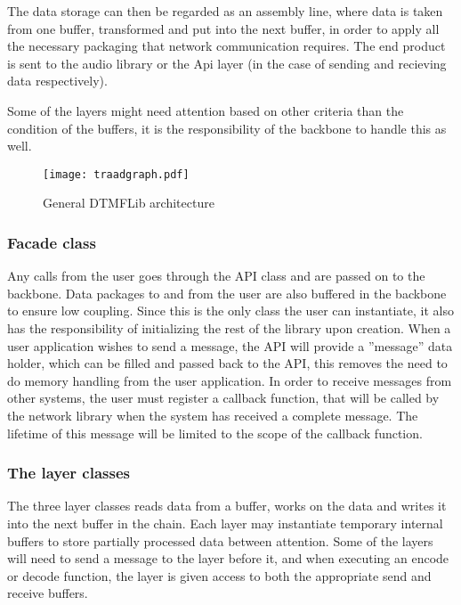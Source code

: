 The data storage can then be regarded as an assembly line, where data is taken from one buffer, transformed and put into the next buffer, in order to apply all the necessary packaging that network communication requires. The end product  is sent to the audio library or the Api layer (in the case of sending and recieving data respectively).

Some of the layers might need attention based on other criteria than the condition of the buffers, it is the responsibility of the backbone to handle this as well.

\begin{figure}[htb]
	\begin{center}
	\texttt{[image: traadgraph.pdf]}
	\caption{General DTMFLib architecture}
	\label{fig:general_architecture}	
	\end{center}
\end{figure}

\subsubsection{Facade class}
Any calls from the user goes through the API class and are passed on to the backbone. Data packages to and from the user are also buffered in the backbone to ensure low coupling. Since this is the only class the user can instantiate, it also has the responsibility of initializing the rest of the library upon creation.
When a user application wishes to send a message, the API will provide a ''message'' data holder, which can be filled and passed back to the API, this removes the need to do memory handling from the user application.
In order to receive messages from other systems, the user must register a callback function, that will be called by the network library when the system has received a complete message. The lifetime of this message will be limited to the scope of the callback function.

\subsubsection{The layer classes}
The three layer classes reads data from a buffer, works on the data and writes it into the next buffer in the chain. Each layer may instantiate temporary internal buffers to store partially processed data between attention. Some of the layers will need to send a message to the layer before it, and when executing an encode or decode function, the layer is given access to both the appropriate send and receive buffers.



